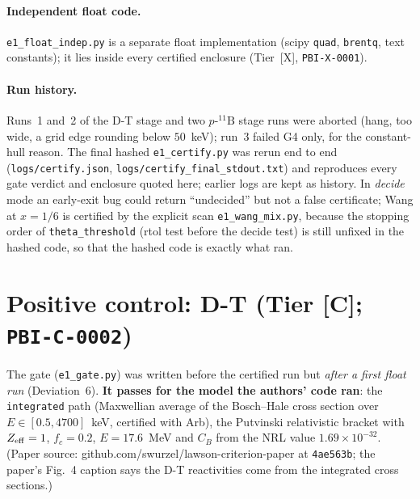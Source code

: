 \documentclass[10pt]{article}
\newcommand{\tier}[1]{\textsf{[#1]}}
\newcommand{\tC}{\tier{C}}
\newcommand{\tX}{\tier{X}}
\newcommand{\pB}{p\text{-}{}^{11}\mathrm{B}}
\begin{document}
\paragraph{Independent float code.} \texttt{e1\_float\_indep.py} is a separate float implementation (scipy \texttt{quad}, \texttt{brentq}, text constants); it lies inside every certified enclosure (Tier~\tX{}, \texttt{PBI-X-0001}).
\paragraph{Run history.} Runs~1 and~2 of the D-T stage and two $\pB$ stage runs were aborted (hang, too wide, a grid edge rounding below $50$~keV); run~3 failed G4 only, for the constant-hull reason. The final hashed \texttt{e1\_certify.py} was rerun end to end (\texttt{logs/certify.json}, \texttt{logs/certify\_final\_stdout.txt}) and reproduces every gate verdict and enclosure quoted here; earlier logs are kept as history. In \emph{decide} mode an early-exit bug could return ``undecided'' but not a false certificate; Wang at $x=1/6$ is certified by the explicit scan \texttt{e1\_wang\_mix.py}, because the stopping order of \texttt{theta\_threshold} (rtol test before the decide test) is still unfixed in the hashed code, so that the hashed code is exactly what ran.

\section{Positive control: D-T (Tier \tC{}; \texttt{PBI-C-0002})}\label{sec:dt}
The gate (\texttt{e1\_gate.py}) was written before the certified run but \emph{after a first float run} (Deviation~6). \textbf{It passes for the model the authors' code ran}: the \texttt{integrated} path (Maxwellian average of the Bosch--Hale cross section over $E\in[0.5,4700]$~keV, certified with Arb), the Putvinski relativistic bracket with $Z_{\rm eff}=1$, $f_c=0.2$, $E=17.6$~MeV and $C_B$ from the NRL value $1.69\times10^{-32}$. (Paper source: github.com/swurzel/lawson-criterion-paper at \texttt{4ae563b}; the paper's Fig.~4 caption says the D-T reactivities come from the integrated cross sections.)
\end{document}
